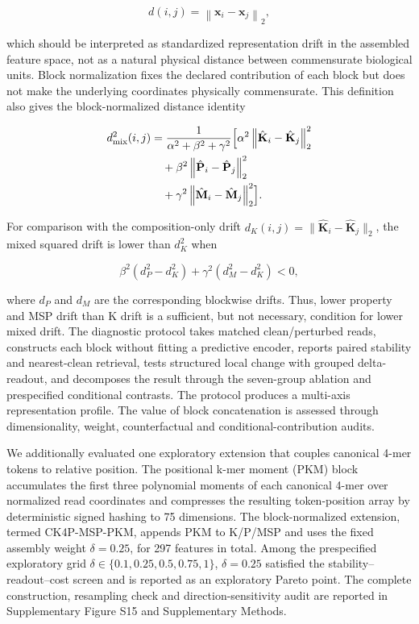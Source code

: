 \[
d(i,j)=\left\|\mathbf{x}_i-\mathbf{x}_j\right\|_2,
\]

which should be interpreted as standardized representation drift in the assembled feature space, not as a natural physical distance between commensurate biological units. Block normalization fixes the declared contribution of each block but does not make the underlying coordinates physically commensurate. This definition also gives the block-normalized distance identity

\[
\begin{aligned}
d_{\mathrm{mix}}^2(i,j)
&=
\frac{1}{\alpha^2+\beta^2+\gamma^2}
\Bigl[
\alpha^2\left\|\hat{\mathbf{K}}_i-\hat{\mathbf{K}}_j\right\|_2^2 \\
&\quad+
\beta^2\left\|\hat{\mathbf{P}}_i-\hat{\mathbf{P}}_j\right\|_2^2 \\
&\quad+
\gamma^2\left\|\hat{\mathbf{M}}_i-\hat{\mathbf{M}}_j\right\|_2^2
\Bigr].
\end{aligned}
\]

For comparison with the composition-only drift $d_K(i,j)=\|\hat{\mathbf{K}}_i-\hat{\mathbf{K}}_j\|_2$, the mixed squared drift is lower than $d_K^2$ when

\[
\beta^2\left(d_P^2-d_K^2\right)+\gamma^2\left(d_M^2-d_K^2\right)<0,
\]

where $d_P$ and $d_M$ are the corresponding blockwise drifts. Thus, lower property and MSP drift than K drift is a sufficient, but not necessary, condition for lower mixed drift. The diagnostic protocol takes matched clean/perturbed reads, constructs each block without fitting a predictive encoder, reports paired stability and nearest-clean retrieval, tests structured local change with grouped delta-readout, and decomposes the result through the seven-group ablation and prespecified conditional contrasts. The protocol produces a multi-axis representation profile. The value of block concatenation is assessed through dimensionality, weight, counterfactual and conditional-contribution audits.

We additionally evaluated one exploratory extension that couples canonical 4-mer tokens to relative position. The positional k-mer moment (PKM) block accumulates the first three polynomial moments of each canonical 4-mer over normalized read coordinates and compresses the resulting token-position array by deterministic signed hashing to 75 dimensions. The block-normalized extension, termed CK4P-MSP-PKM, appends PKM to K/P/MSP and uses the fixed assembly weight $\delta=0.25$, for 297 features in total. Among the prespecified exploratory grid $\delta\in\{0.1,0.25,0.5,0.75,1\}$, $\delta=0.25$ satisfied the stability--readout--cost screen and is reported as an exploratory Pareto point. The complete construction, resampling check and direction-sensitivity audit are reported in Supplementary Figure S15 and Supplementary Methods.

